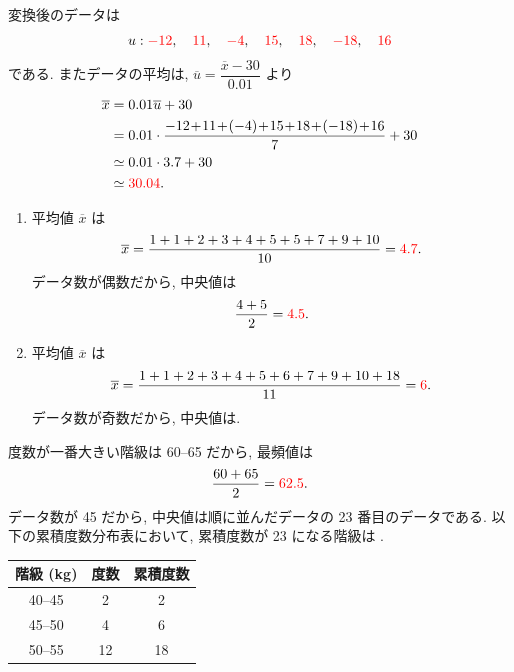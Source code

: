 \begin{qenumerate}
{\begin{align}
		\end{align}
	}
	\item{
		変換後のデータは
		\begin{align}
			u: \textcolor{red}{-12}, \quad \textcolor{red}{11}, \quad \textcolor{red}{-4}, \quad \textcolor{red}{15}, \quad \textcolor{red}{18}, \quad \textcolor{red}{-18}, \quad \textcolor{red}{16}
		\end{align}
		である.
		またデータの平均は, $\overline{u} = \dfrac{\overline{x} - 30}{0.01}$ より
		\begin{align}
			\overline{x} &= 0.01\overline{u} + 30 \\
				&= 0.01\cdot\frac{-12 \! + \! 11 \! + \! (-4) \! + \! 15 \! + \! 18 \! + \! (-18) \! + \! 16}{7} + 30 \\
				&\simeq 0.01\cdot 3.7 + 30 \\
				&\simeq \red{30.04}. 
		\end{align}
	}
	\item{
		\begin{enumerate}
			\item{
				平均値 $\overline{x}$ は
				\begin{align}
					\overline{x} = \frac{1 + 1 + 2 + 3 + 4 + 5 + 5 + 7 + 9 + 10}{10} = \textcolor{red}{4.7}.
				\end{align}
				データ数が偶数だから, 中央値は
				\begin{align}
					\frac{4 + 5}{2} = \textcolor{red}{4.5}.
				\end{align}
			}
			\item{
				平均値 $\overline{x}$ は
				\begin{align}
					\overline{x} = \frac{1 + 1 + 2 + 3 + 4 + 5 + 6 + 7 + 9 + 10 + 18}{11} = \textcolor{red}{6}.
				\end{align}
				データ数が奇数だから, 中央値は.
			}
		\end{enumerate}
	}
	\item{
		度数が一番大きい階級は 60--65 だから, 最頻値は
		\begin{align}
			\frac{60 + 65}{2} = \textcolor{red}{62.5}.
		\end{align}
		データ数が 45 だから, 中央値は順に並んだデータの 23 番目のデータである.
		以下の累積度数分布表において, 累積度数が 23 になる階級は .
		\begin{table}[H]
			\centering
			\begin{tabular}{c|c|c} \hline
				階級 (kg) & 度数 & 累積度数 \\ \hline
				40--45 &  2 &  2 \\
				45--50 &  4 &  6 \\
				50--55 & 12 & 18 \\

\end{tabular}
\end{table}}
\end{qenumerate}
